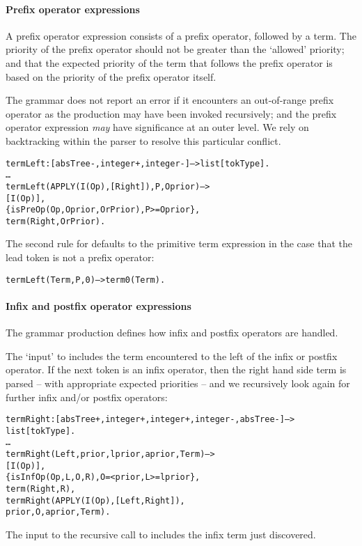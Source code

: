 \paragraph{Prefix operator expressions}
A prefix operator expression consists of a prefix operator, followed by a term. The priority of the prefix operator should not be greater than the `allowed' priority; and that the expected priority of the term that follows the prefix operator is based on the priority of the prefix operator itself.
	
The  grammar does not report an error if it encounters an out-of-range prefix operator as the  production may have been invoked recursively; and the prefix operator expression {\em may} have significance at an outer level. We rely on backtracking within the parser to resolve this particular conflict.

\begin{alltt}
termLeft:[absTree-,integer+,integer-]-->list[tokType].
\ldots
termLeft(APPLY(I(Op),[Right]),P,Oprior) -->
    [I(Op)],
    \{isPreOp(Op,Oprior,OrPrior), P>=Oprior\},
    term(Right,OrPrior).
\end{alltt}
      
The second rule for  defaults to the primitive term expression in the case that the lead token is not a prefix operator:

\begin{alltt}
termLeft(Term,P,0) --> term0(Term).
\end{alltt}

\paragraph{Infix and postfix operator expressions}
The  grammar production defines how infix and postfix operators are handled.

The `input' to  includes the term encountered to the left of the infix or postfix operator. If the next token is an infix operator, then the right hand side term is parsed -- with appropriate expected priorities -- and we recursively look again for further infix and/or postfix operators:
\begin{alltt}
termRight:[absTree+,integer+,integer+,integer-,absTree-]-->
    list[tokType].
\ldots
termRight(Left,prior,lprior,aprior,Term) -->
    [I(Op)],
    \{ isInfOp(Op,L,O,R),O=<prior,L>=lprior \},
    term(Right,R),
    termRight(APPLY(I(Op),[Left,Right]),
	          prior,O,aprior,Term).
\end{alltt}
The input to the recursive call to  includes the infix term just discovered. 

